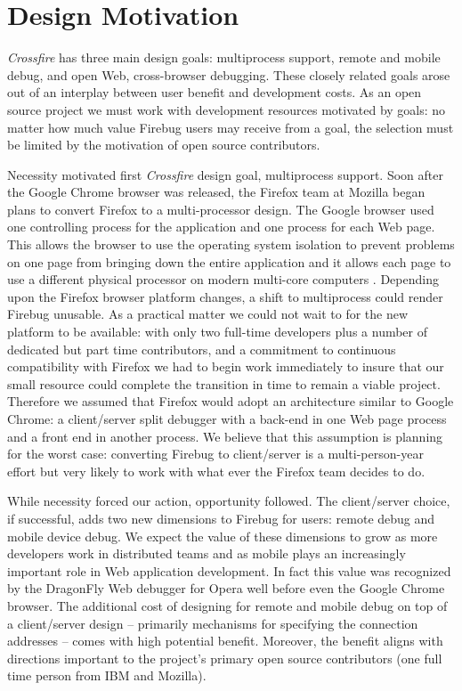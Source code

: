\section{Design Motivation}
\textit{Crossfire} has three main design goals: multiprocess support, remote and
mobile debug, and open Web, cross-browser debugging.
These closely related goals arose out of an interplay between user benefit and development costs.
As an open source project we must work with development resources motivated by
goals: no matter how much value Firebug users may receive from a goal, the
selection must be limited by the motivation of open source contributors.

Necessity motivated first \textit{Crossfire} design goal, multiprocess support.
Soon after the Google Chrome browser was released, the Firefox team at Mozilla
began plans to convert Firefox to a multi-processor design.  The Google browser
used one controlling process for the application and one process for each Web
page.  This allows the browser to use the operating system isolation to prevent
problems on one page from bringing down the entire application and it allows
each page to use a different physical processor on modern multi-core computers
\cite{GoogleChrome}.  Depending upon the Firefox browser platform changes, a
shift to multiprocess could render Firebug unusable. As a practical matter we
could not wait to for the new platform to be available: with only two full-time
developers plus a number of dedicated but part time contributors, and a commitment to continuous
compatibility with Firefox we had to begin work immediately to insure that our
small resource could complete the transition in time to remain a viable project.
Therefore we assumed that Firefox would adopt an architecture similar to Google
Chrome: a client/server split debugger with a back-end in one Web page process
and a front end in another process.  We believe that this assumption is planning
for the worst case: converting Firebug to client/server is a multi-person-year
effort but very likely to work with what ever the Firefox team decides to do.

While necessity forced our action, opportunity followed. The client/server
choice, if successful, adds two new dimensions to Firebug for users: remote
debug and mobile device debug. We expect the value of these dimensions to grow
as more developers work in distributed teams and as mobile plays an increasingly
important role in Web application development.  In fact this value was
recognized by the DragonFly Web debugger for Opera well before even the Google
Chrome browser.   The additional cost of designing for remote and mobile debug
on top of a client/server design -- primarily mechanisms for specifying the
connection addresses -- comes with high potential benefit.  Moreover, the benefit
aligns with directions important to the project's primary open source
contributors (one full time person from IBM and Mozilla).

